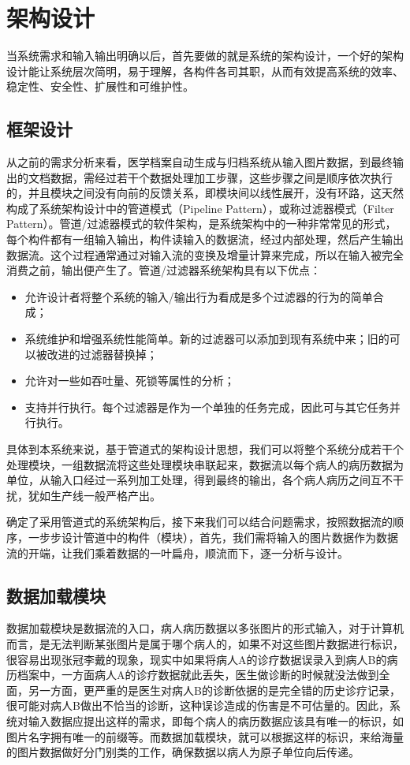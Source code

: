 \chapter{架构设计}
\label{chap:system-framework}
当系统需求和输入输出明确以后，首先要做的就是系统的架构设计，一个好的架构设计能让系统层次简明，易于理解，各构件各司其职，从而有效提高系统的效率、稳定性、安全性、扩展性和可维护性。

\section{框架设计}
从之前的需求分析来看，医学档案自动生成与归档系统从输入图片数据，到最终输出的文档数据，需经过若干个数据处理加工步骤，这些步骤之间是顺序依次执行的，并且模块之间没有向前的反馈关系，即模块间以线性展开，没有环路，这天然构成了系统架构设计中的管道模式（Pipeline Pattern），或称过滤器模式（Filter Pattern）。管道/过滤器模式的软件架构，是系统架构中的一种非常常见的形式，每个构件都有一组输入输出，构件读输入的数据流，经过内部处理，然后产生输出数据流。这个过程通常通过对输入流的变换及增量计算来完成，所以在输入被完全消费之前，输出便产生了。管道/过滤器系统架构具有以下优点：
\begin{itemize}
	\item 允许设计者将整个系统的输入/输出行为看成是多个过滤器的行为的简单合成；
	\item 系统维护和增强系统性能简单。新的过滤器可以添加到现有系统中来；旧的可以被改进的过滤器替换掉；
	\item 允许对一些如吞吐量、死锁等属性的分析；
	\item 支持并行执行。每个过滤器是作为一个单独的任务完成，因此可与其它任务并行执行。
\end{itemize}
具体到本系统来说，基于管道式的架构设计思想，我们可以将整个系统分成若干个处理模块，一组数据流将这些处理模块串联起来，数据流以每个病人的病历数据为单位，从输入口经过一系列加工处理，得到最终的输出，各个病人病历之间互不干扰，犹如生产线一般严格产出。

确定了采用管道式的系统架构后，接下来我们可以结合问题需求，按照数据流的顺序，一步步设计管道中的构件（模块），首先，我们需将输入的图片数据作为数据流的开端，让我们乘着数据的一叶扁舟，顺流而下，逐一分析与设计。

\section{数据加载模块}
数据加载模块是数据流的入口，病人病历数据以多张图片的形式输入，对于计算机而言，是无法判断某张图片是属于哪个病人的，如果不对这些图片数据进行标识，很容易出现张冠李戴的现象，现实中如果将病人A的诊疗数据误录入到病人B的病历档案中，一方面病人A的诊疗数据就此丢失，医生做诊断的时候就没法做到全面，另一方面，更严重的是医生对病人B的诊断依据的是完全错的历史诊疗记录，很可能对病人B做出不恰当的诊断，这种误诊造成的伤害是不可估量的。因此，系统对输入数据应提出这样的需求，即每个病人的病历数据应该具有唯一的标识，如图片名字拥有唯一的前缀等。而数据加载模块，就可以根据这样的标识，来给海量的图片数据做好分门别类的工作，确保数据以病人为原子单位向后传递。

